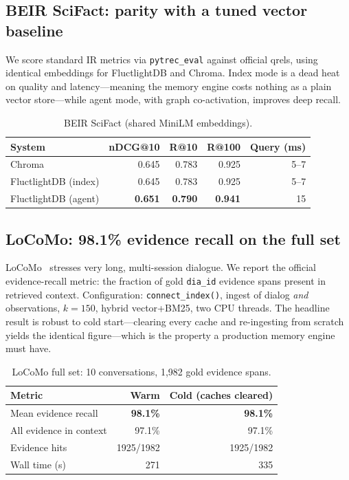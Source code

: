 \documentclass[11pt]{article}
\begin{document}
\subsection{BEIR SciFact: parity with a tuned vector baseline}
We score standard IR metrics via \texttt{pytrec\_eval} against official qrels,
using identical embeddings for FluctlightDB and Chroma. Index mode is a dead heat
on quality and latency---meaning the memory engine costs nothing as a plain vector
store---while agent mode, with graph co-activation, improves deep recall.

\begin{table}[h]
\centering
\caption{BEIR SciFact (shared MiniLM embeddings).}
\begin{tabular}{lrrrr}
\toprule
System & nDCG@10 & R@10 & R@100 & Query (ms) \\
\midrule
Chroma & 0.645 & 0.783 & 0.925 & 5--7 \\
FluctlightDB (index) & 0.645 & 0.783 & 0.925 & 5--7 \\
FluctlightDB (agent) & \textbf{0.651} & \textbf{0.790} & \textbf{0.941} & 15 \\
\bottomrule
\end{tabular}
\end{table}

\subsection{LoCoMo: 98.1\% evidence recall on the full set}
LoCoMo~\cite{maharana2024locomo} stresses very long, multi-session dialogue. We
report the official evidence-recall metric: the fraction of gold \texttt{dia\_id}
evidence spans present in retrieved context. Configuration: \texttt{connect\_index()},
ingest of dialog \emph{and} observations, $k{=}150$, hybrid vector+BM25, two CPU
threads. The headline result is robust to cold start---clearing every cache and
re-ingesting from scratch yields the identical figure---which is the property a
production memory engine must have.

\begin{table}[h]
\centering
\caption{LoCoMo full set: 10 conversations, 1{,}982 gold evidence spans.}
\begin{tabular}{lrr}
\toprule
Metric & Warm & Cold (caches cleared) \\
\midrule
Mean evidence recall & \textbf{98.1\%} & \textbf{98.1\%} \\
All evidence in context & 97.1\% & 97.1\% \\
Evidence hits & 1925/1982 & 1925/1982 \\
Wall time (s) & 271 & 335 \\
\bottomrule
\end{tabular}
\end{table}
\end{document}
